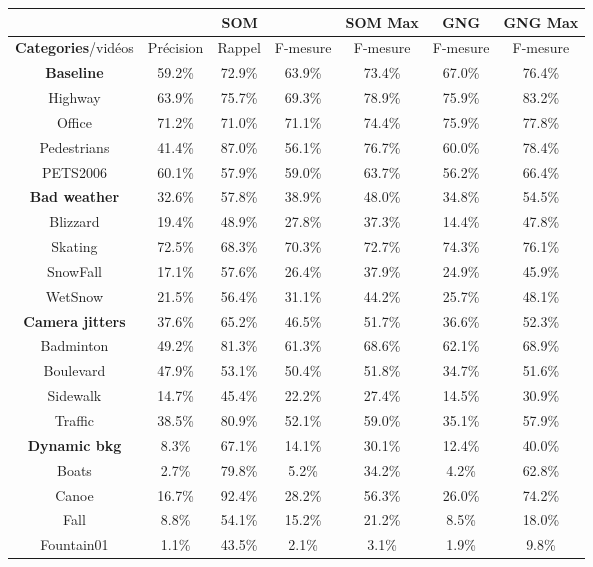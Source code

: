 	\begin{tableth}
    \begin{tabular}{|c|c|c|c|c|c|c|}
		\hline
		& \multicolumn{3}{c|}{SOM} & SOM Max & GNG & GNG Max\\
        \hline
        \textbf{Categories}/vidéos & Précision & Rappel & F-mesure & F-mesure & F-mesure & F-mesure\\
        \hline
        \textbf{Baseline} & 59.2\% & 72.9\% & 63.9\% & 73.4\% & 67.0\% & 76.4\% \\
		\hline
		Highway & 63.9\% & 75.7\% & 69.3\% & 78.9\% & 75.9\% & 83.2\% \\
		Office & 71.2\% & 71.0\% & 71.1\% & 74.4\% & 75.9\% & 77.8\% \\
		Pedestrians & 41.4\% & 87.0\% & 56.1\% & 76.7\% & 60.0\% & 78.4\% \\
		PETS2006 & 60.1\% & 57.9\% & 59.0\% & 63.7\% & 56.2\% & 66.4\% \\
		\hline
        \textbf{Bad weather} & 32.6\% & 57.8\% & 38.9\% & 48.0\% & 34.8\% & 54.5\% \\
		\hline
		Blizzard & 19.4\% & 48.9\% & 27.8\% & 37.3\% & 14.4\% & 47.8\% \\
		Skating & 72.5\% & 68.3\% & 70.3\% & 72.7\% & 74.3\% & 76.1\% \\
		SnowFall & 17.1\% & 57.6\% & 26.4\% & 37.9\% & 24.9\% & 45.9\% \\
		WetSnow & 21.5\% & 56.4\% & 31.1\% & 44.2\% & 25.7\% & 48.1\% \\
		\hline
        \textbf{Camera jitters} & 37.6\% & 65.2\% & 46.5\% & 51.7\% & 36.6\% & 52.3\% \\
		\hline
		Badminton & 49.2\% & 81.3\% & 61.3\% & 68.6\% & 62.1\% & 68.9\% \\
		Boulevard & 47.9\% & 53.1\% & 50.4\% & 51.8\% & 34.7\% & 51.6\% \\
		Sidewalk & 14.7\% & 45.4\% & 22.2\% & 27.4\% & 14.5\% & 30.9\% \\
		Traffic & 38.5\% & 80.9\% & 52.1\% & 59.0\% & 35.1\% & 57.9\% \\
		\hline
        \textbf{Dynamic bkg} & 8.3\% & 67.1\% & 14.1\% & 30.1\% & 12.4\% & 40.0\% \\
		\hline
		Boats & 2.7\% & 79.8\% & 5.2\% & 34.2\% & 4.2\% & 62.8\% \\
		Canoe & 16.7\% & 92.4\% & 28.2\% & 56.3\% & 26.0\% & 74.2\% \\
		Fall & 8.8\% & 54.1\% & 15.2\% & 21.2\% & 8.5\% & 18.0\% \\
		Fountain01 & 1.1\% & 43.5\% & 2.1\% & 3.1\% & 1.9\% & 9.8\% \\

\end{tabular}
\end{tableth}
